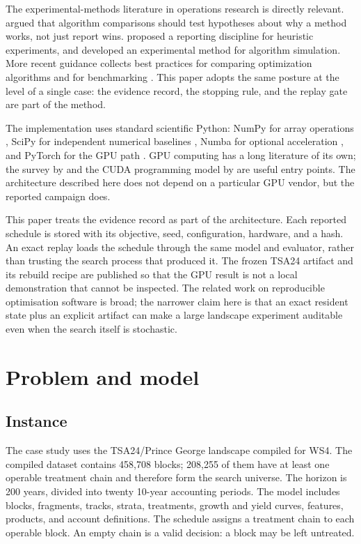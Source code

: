 \documentclass[11pt]{article}
\begin{document}
The experimental-methods literature in operations research is directly relevant. \citet{hooker1995}
argued that algorithm comparisons should test hypotheses about why a method works, not just report
wins. \citet{barr1995} proposed a reporting discipline for heuristic experiments, and
\citet{mcgeoch1996} developed an experimental method for algorithm simulation. More recent guidance
collects best practices for comparing optimization algorithms and for benchmarking
\citep{beiranvand2017,bartz2020}. This paper adopts the same posture at the level of a single case:
the evidence record, the stopping rule, and the replay gate are part of the method.

The implementation uses standard scientific Python: NumPy for array operations
\citep{harris2020}, SciPy for independent numerical baselines \citep{virtanen2020}, Numba for
optional acceleration \citep{lam2015}, and PyTorch for the GPU path \citep{paszke2019}. GPU
computing has a long literature of its own; the survey by \citet{owens2008} and the CUDA programming
model by \citet{nickolls2008} are useful entry points. The architecture described here does not
depend on a particular GPU vendor, but the reported campaign does.

This paper treats the evidence record as part of the architecture. Each reported schedule is stored
with its objective, seed, configuration, hardware, and a hash. An exact replay loads the schedule
through the same model and evaluator, rather than trusting the search process that produced it. The
frozen TSA24 artifact and its rebuild recipe are published so that the GPU result is not a local
demonstration that cannot be inspected. The related work on reproducible optimisation software is
broad; the narrower claim here is that an exact resident state plus an explicit artifact can make a
large landscape experiment auditable even when the search itself is stochastic.

\section{Problem and model}\label{problem-and-model}

\subsection{Instance}\label{instance}

The case study uses the TSA24/Prince George landscape compiled for WS4. The compiled dataset contains 458,708 blocks; 208,255 of them have at least one operable treatment chain and therefore form the search universe. The horizon is 200 years, divided into twenty 10-year accounting periods. The model includes blocks, fragments, tracks, strata, treatments, growth and yield curves, features, products, and account definitions. The schedule assigns a treatment chain to each operable block. An empty chain is a valid decision: a block may be left untreated.
\end{document}
